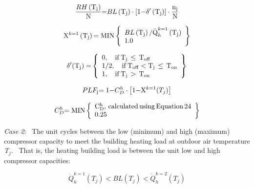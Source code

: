 \begin{equation}
\frac{{RH\left( {{{\rm{T}}_{\rm{j}}}} \right)}}{{\rm{N}}}{\rm{ = }}BL\left( {{{\rm{T}}_{\rm{j}}}} \right) \cdot \left[ {{\rm{1 - }}{{\rm{\delta }}^\prime}\left( {{{\rm{T}}_{\rm{j}}}} \right)} \right] \cdot \frac{{{{\rm{n}}_{\rm{j}}}}}{{\rm{N}}}
\end{equation}

\begin{equation}
{{\rm{X}}^{k = 1}}\left( {{{\rm{T}}_{\rm{j}}}} \right){\rm{ = MIN}}\left\{ \begin{array}{l}BL\left( {{{\rm{T}}_{\rm{j}}}} \right){\rm{/\dot Q}}_h^{k = 1}\left( {{{\rm{T}}_{\rm{j}}}} \right)\\1.0\end{array} \right\}
\end{equation}

\begin{equation}
{\delta ^\prime}{\rm{(}}{{\rm{T}}_{\rm{j}}}{\rm{) = }}\left\{ \begin{array}{l}0,\quad {\rm{if}}\,{{\rm{T}}_{\rm{j}}}\, \le \,{{\rm{T}}_{{\rm{off}}}}\,\\1/2,\quad {\rm{if}}\,{{\rm{T}}_{{\rm{off}}}} < {{\rm{T}}_{\rm{j}}}\, \le \,{{\rm{T}}_{{\rm{on}}}}\\1,\quad {\rm{if}}\,{{\rm{T}}_{\rm{j}}}\, > \,{{\rm{T}}_{{\rm{on}}}}\end{array} \right\}
\end{equation}

\begin{equation}
PL{F_{\rm{j}}}{\rm{ = 1 - }}C_D^h \cdot \left[ {{\rm{1 - }}{{\rm{X}}^{k = 1}}{\rm{(}}{T_j}{\rm{)}}} \right]
\end{equation}

\begin{equation}
C_D^h{\rm{ = MIN}}\left\{ \begin{array}{l}{\rm{C}}_{\rm{D}}^{\rm{h}},\,{\rm{calculated}}\,{\rm{using}}\,{\rm{Equation}}\,{\rm{24}}\\0.25\end{array} \right\}
\end{equation}

\emph{Case 2}:~ The unit cycles between the low (minimum) and high (maximum) compressor capacity to meet the building heating load at outdoor air temperature \emph{T\(_{j}\)}.~ That is, the heating building load is between the unit low and high compressor capacities:

\begin{equation}
\dot Q_h^{k = 1}({T_j}) < BL({T_j}) < \dot Q_h^{k = 2}({T_j})
\end{equation}

